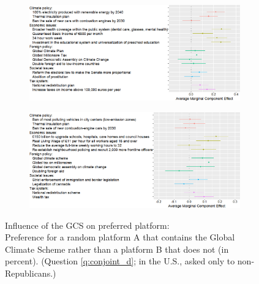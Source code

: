 \begin{bibunit}
\begin{figure}[h!]
\begin{subfigure}{\textwidth}
  \end{subfigure}
  \begin{subfigure}{\textwidth}
    \includegraphics[width=\textwidth]{../figures/ES/ca_r_en.png}
  \end{subfigure}
  \begin{subfigure}{\textwidth}
    \includegraphics[width=\textwidth]{../figures/UK/ca_r.png}
  \end{subfigure}
\end{figure}

\begin{figure}[h!]
  \caption[Influence of the GCS on preferred platform]{Influence of the GCS on preferred platform:\\ Preference for a random platform A that contains the Global Climate Scheme rather than a platform B that does not (in percent). (Question \ref{q:conjoint_d}; in the U.S., asked only to non-Republicans.)}\label{fig:conjoint_left_ag_b}
\end{figure}


\end{bibunit}
